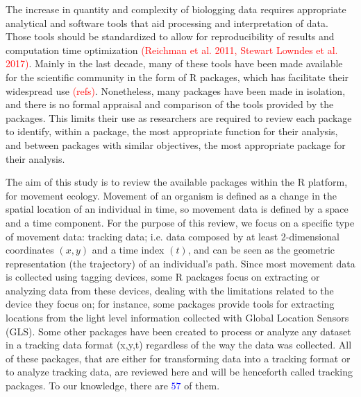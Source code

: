 \documentclass[a4paper,12pt]{article}
\begin{document}
The increase in quantity and complexity of biologging data requires appropriate analytical and software tools that aid processing and interpretation of data. Those tools should be standardized to allow for reproducibility of results and computation time optimization \textcolor{red}{(Reichman et al. 2011, Stewart Lowndes et al. 2017)}. Mainly in the last decade, many of these tools have been made available for the scientific community in the form of R packages, which has facilitate their widespread use \textcolor{red}{(refs)}. Nonetheless, many packages have been made in isolation, and there is no formal appraisal and comparison of the tools provided by the packages. This limits their use as researchers are required to review each package to identify, within a package, the most appropriate function for their analysis, and between packages with similar objectives, the most appropriate package for their analysis. 
      
The aim of this study is to review the available packages within the R platform, for movement ecology. %
Movement of an organism is defined as a change in the spatial location of an individual in time, so movement data is defined by a space and a time component. For the purpose of this review, we focus on a specific type of movement data: tracking data; i.e. data composed by at least 2-dimensional coordinates $(x,y)$ and a time index $(t)$, and can be seen as the geometric representation (the trajectory) of an individual's path. Since most movement data is collected using tagging devices, some R packages focus on extracting or analyzing data from these devices, dealing with the limitations related to the device they focus on; for instance, some packages provide tools for extracting locations from the light level information collected with Global Location Sensors (GLS). Some other packages have been created to process or analyze any dataset in a tracking data format (x,y,t) regardless of the way the data was collected. All of these packages, that are either for transforming data into a tracking format or to analyze tracking data, are reviewed here and will be henceforth called tracking packages. To our knowledge, there are \textcolor{blue}{$57$} of them. 
\end{document}
